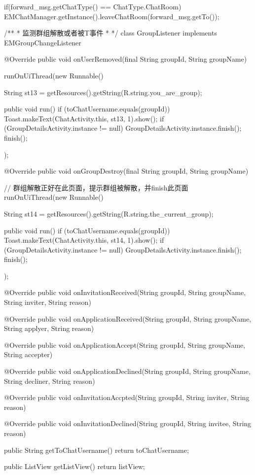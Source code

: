 {{		if(forward_msg.getChatType() == ChatType.ChatRoom){
			EMChatManager.getInstance().leaveChatRoom(forward_msg.getTo());
		}
	}
	
	/**
	 * 监测群组解散或者被T事件
	 * 
	 */
	class GroupListener implements EMGroupChangeListener {

		@Override
		public void onUserRemoved(final String groupId, String groupName) {
			runOnUiThread(new Runnable() {
				String st13 = getResources().getString(R.string.you_are_group);

				public void run() {
					if (toChatUsername.equals(groupId)) {
						Toast.makeText(ChatActivity.this, st13, 1).show();
						if (GroupDetailsActivity.instance != null)
							GroupDetailsActivity.instance.finish();
						finish();
					}
				}
			});
		}

		@Override
		public void onGroupDestroy(final String groupId, String groupName) {
			// 群组解散正好在此页面，提示群组被解散，并finish此页面
			runOnUiThread(new Runnable() {
				String st14 = getResources().getString(R.string.the_current_group);

				public void run() {
					if (toChatUsername.equals(groupId)) {
						Toast.makeText(ChatActivity.this, st14, 1).show();
						if (GroupDetailsActivity.instance != null)
							GroupDetailsActivity.instance.finish();
						finish();
					}
				}
			});
		}

        @Override
        public void onInvitationReceived(String groupId, String groupName,
                String inviter, String reason) {            
        }

        @Override
        public void onApplicationReceived(String groupId, String groupName,
                String applyer, String reason) {            
        }

        @Override
        public void onApplicationAccept(String groupId, String groupName,
                String accepter) {
            
        }

        @Override
        public void onApplicationDeclined(String groupId, String groupName,
                String decliner, String reason) {            
        }

        @Override
        public void onInvitationAccpted(String groupId, String inviter,
                String reason) {            
        }

        @Override
        public void onInvitationDeclined(String groupId, String invitee,
                String reason) {            
        }

	}

	public String getToChatUsername() {
		return toChatUsername;
	}

	public ListView getListView() {
		return listView;
	}

}
